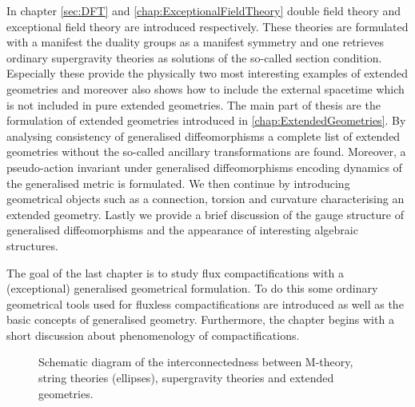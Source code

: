 In chapter \ref{sec:DFT} and \ref{chap:ExceptionalFieldTheory} double field theory and exceptional field theory are introduced respectively. These theories are formulated with a manifest the duality groups as a manifest symmetry and one retrieves ordinary supergravity theories as solutions of the so-called section condition. Especially these provide the physically two most interesting examples of extended geometries and moreover also shows how to include the external spacetime which is not included in pure extended geometries. The main part of thesis are the formulation of extended geometries introduced in \ref{chap:ExtendedGeometries}. By analysing consistency of generalised diffeomorphisms a complete list of extended geometries without the so-called ancillary transformations are found. Moreover, a pseudo-action invariant under generalised diffeomorphisms encoding dynamics of the generalised metric is formulated. We then continue by introducing geometrical objects such as a connection, torsion and curvature characterising an extended geometry. Lastly we provide a brief discussion of the gauge structure of generalised diffeomorphisms and the appearance of interesting algebraic structures. 

The goal of the last chapter is to study flux compactifications with a (exceptional) generalised geometrical formulation. To do this some ordinary geometrical tools used for fluxless compactifications are introduced as well as the basic concepts of generalised geometry. Furthermore, the chapter begins with a short discussion about phenomenology of compactifications. 





\begin{figure}
    \caption{Schematic diagram of the interconnectedness between M-theory, string theories (ellipses), supergravity theories and extended geometries.}
    \label{fig:TheGodFather}
\end{figure}


